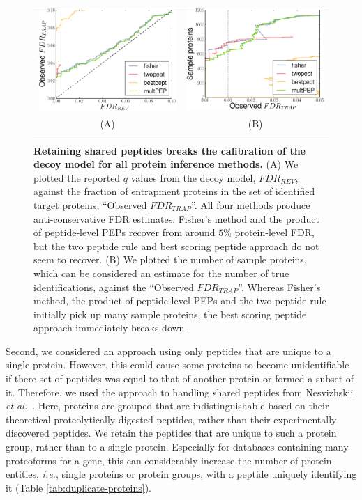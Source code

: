 \documentclass{article}
\begin{document}
\begin{figure}[!htp]
\begin{center}
\begin{tabular}{cc} 
\includegraphics[width=0.45\linewidth]{./img/shared-pept-accuracy} &
\includegraphics[width=0.45\linewidth]{./img/shared-pept-performance}
\\
(A) & (B)
\end{tabular}

\caption{\label{fig:shared-accuracy}\textbf{Retaining shared peptides
breaks the calibration of the decoy model for all protein inference
methods.} (A) We plotted the reported $q$ values from the decoy model,
$FDR_{REV}$, against the fraction of entrapment proteins in the set of
identified target proteins, ``Observed $FDR_{TRAP}$''. All four
methods produce anti-conservative FDR estimates. Fisher's method and
the product of peptide-level PEPs recover from around $5\%$
protein-level FDR, but the two peptide rule and best scoring peptide
approach do not seem to recover. (B) We plotted the number of sample
proteins, which can be considered an estimate for the number of true
identifications, against the ``Observed $FDR_{TRAP}$''. Whereas
Fisher's method, the product of peptide-level PEPs and the two peptide
rule initially pick up many sample proteins, the best scoring peptide
approach immediately breaks down.}
\end{center} 
\end{figure}

Second, we considered an approach using only peptides that are unique
to a single protein. However, this could cause some proteins to become
unidentifiable if there set of peptides was equal to that of another
protein or formed a subset of it. Therefore, we used the approach to
handling shared peptides from Nesvizhskii {\em et
al.}~\cite{nesvizhskii2003statistical}. Here, proteins are grouped
that are indistinguishable based on their theoretical proteolytically
digested peptides, rather than their experimentally discovered
peptides. We retain the peptides that are unique to such a protein
group, rather than to a single protein. Especially for databases
containing many proteoforms for a gene, this can considerably increase
the number of protein entities, {\em i.e.}, single proteins or protein
groups, with a peptide uniquely identifying it (Table
\ref{tab:duplicate-proteins}).
\end{document}
